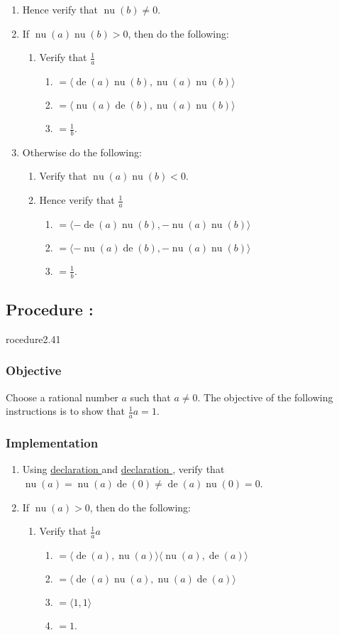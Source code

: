 \documentclass{article}
\DeclareMathOperator{\Nu}{nu}
\DeclareMathOperator{\De}{de}
\newcounter{declaration}[part]
\newcommand{\declarationhr}[1]{\hyperref[sec:declaration #1]{declaration \expandafter\csname declaration#1\endcsname}}
\newcounter{procedure}[part]
\newcommand{\procedure}[1]{\subsection*{Procedure \thepart:\theprocedure}\label{sec:procedure #1}\global\expandafter\edef\csname procedure#1\endcsname{\thepart:\theprocedure}\addtocounter{procedure}{1}}
\newcommand{\objective}{\subsubsection*{Objective}}
\newcommand{\implementation}{\subsubsection*{Implementation}}
\begin{document}
\begin{multicols}{2}
\begin{enumerate}
					\item Hence verify that $\Nu(b)\ne 0$.
					\item If $\Nu(a)\Nu(b)>0$, then do the following:
					\begin{enumerate}
						\item Verify that $\frac{1}{a}$
						\begin{enumerate}
							\item $=\langle\De(a)\Nu(b),\Nu(a)\Nu(b)\rangle$
							\item $=\langle\Nu(a)\De(b),\Nu(a)\Nu(b)\rangle$
							\item $=\frac{1}{b}$.
						\end{enumerate}
					\end{enumerate}
					\item Otherwise do the following:
					\begin{enumerate}
						\item Verify that $\Nu(a)\Nu(b)<0$.
						\item Hence verify that $\frac{1}{a}$
						\begin{enumerate}
							\item $=\langle-\De(a)\Nu(b),-\Nu(a)\Nu(b)\rangle$
							\item $=\langle-\Nu(a)\De(b),-\Nu(a)\Nu(b)\rangle$
							\item $=\frac{1}{b}$.
						\end{enumerate}
					\end{enumerate}
				\end{enumerate}
		\procedure{2.41}
			\objective
				Choose a rational number $a$ such that $a\ne 0$. The objective of the following instructions is to show that $\frac{1}{a}a=1$.
			\implementation
				\begin{enumerate}
					\item Using \declarationhr{2.15} and \declarationhr{2.17}, verify that $\Nu(a)=\Nu(a)\De(0)\ne\De(a)\Nu(0)=0$.
					\item If $\Nu(a)>0$, then do the following:
					\begin{enumerate}
						\item Verify that $\frac{1}{a}a$
						\begin{enumerate}
							\item $=\langle\De(a),\Nu(a)\rangle\langle\Nu(a),\De(a)\rangle$
							\item $=\langle\De(a)\Nu(a),\Nu(a)\De(a)\rangle$
							\item $=\langle 1,1\rangle$
							\item $=1$.

\end{enumerate}
\end{enumerate}
\end{enumerate}
\end{multicols}
\end{document}

